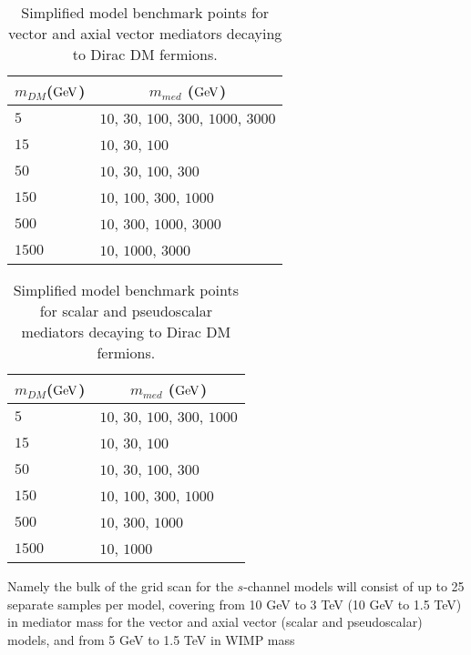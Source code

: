 \documentclass[a4,debug,notitlepage,nobib]{tufte-handout}
\newcommand{\mdm}{\ensuremath{m_{DM}}\xspace}
\begin{document}
\begin{table}[!ht]
\centering
\begin{tabular}{| l | l |}
\hline
\multicolumn{1}{|c|}{\mdm (${\rm GeV}$)} & \multicolumn{1}{c|}{$m_{med}$ (${\rm GeV}$)} \\
\hline
 $5$    & $10$, $30$, $100$, $300$, $1000$, $3000$\\
 $15$   & $10$, $30$, $100$ \\
 $50$   & $10$, $30$, $100$, $300$ \\
 $150$  & $10$, \hspace{12pt} $100$, $300$, $1000$\\
 $500$  & $10$, \hspace{33pt} $300$, $1000$, $3000$  \\
 $1500$  &  $10$,\hspace{57pt} $1000$, $3000$ \\
\hline
\end{tabular}
\caption{Simplified model benchmark points for vector and axial vector mediators
decaying to Dirac DM fermions.}
\label{tab:mMedmDM_VA}
\end{table}

\begin{table}[!ht]
\centering
\begin{tabular}{| l | l |}
\hline
\multicolumn{1}{|c|}{\mdm (${\rm GeV}$)} & \multicolumn{1}{c|}{$m_{med}$ (${\rm GeV}$)} \\
\hline
 $5$    & $10$, $30$, $100$, $300$, $1000$\\
 $15$   & $10$, $30$, $100$ \\
 $50$   & $10$, $30$, $100$, $300$ \\
 $150$  & $10$, \hspace{12pt} $100$, $300$, $1000$\\
 $500$  & $10$, \hspace{33pt} $300$, $1000$ \\
 $1500$  &  $10$,\hspace{57pt} $1000$ \\
\hline
\end{tabular}
\caption{Simplified model benchmark points for scalar and pseudoscalar mediators
decaying to Dirac DM fermions.}
\label{tab:mMedmDM_SP}
\end{table}


Namely the bulk of the grid scan for
the $s$-channel models will consist of up to 25 separate
samples per model, covering from 10 GeV to 3 TeV (10 GeV to 1.5 TeV)
in mediator mass for the vector and axial vector (scalar and pseudoscalar) models,
and from 5 GeV to 1.5 TeV in WIMP mass
\end{document}
